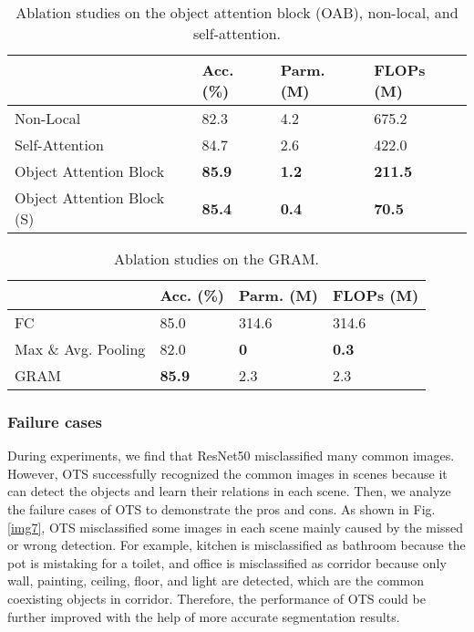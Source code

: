 \documentclass[letterpaper, 10 pt, conference]{ieeeconf}  %
\begin{document}
\begin{tiny}
\begin{table}[tp!]
\centering
\caption{Ablation studies on the object attention block (OAB), non-local, and self-attention.}\label{tab8}
\begin{tabular}{llll}
\hline
&Acc. (\%)&Parm. (M)&FLOPs (M)\\
\hline
Non-Local \cite{Wang2017}&82.3&4.2&675.2\\
Self-Attention \cite{Zhang2019}&84.7&2.6&422.0\\
Object Attention Block&\textbf{85.9}&\textbf{1.2}&\textbf{211.5}\\
Object Attention Block (S)&\textbf{85.4}&\textbf{0.4}&\textbf{70.5}\\
\hline
\end{tabular}
\vspace{-5mm}
\end{table}
\end{tiny}

\begin{tiny}
\begin{table}[tp!]
\centering
\caption{Ablation studies on the GRAM.}\label{tab9}
\begin{tabular}{llll}
\hline
&Acc. (\%)&Parm. (M)&FLOPs (M)\\
\hline
FC&85.0&314.6&314.6\\
Max \& Avg. Pooling&82.0&\textbf{0}&\textbf{0.3}\\
GRAM&\textbf{85.9}&2.3&2.3\\
\hline
\end{tabular}
\vspace{-5mm}
\end{table}
\end{tiny}

\vspace{1mm}
\subsubsection{Failure cases}
\label{Failure cases}
During experiments, we find that ResNet50 misclassified many common images. However, OTS successfully recognized the common images in scenes because it can detect the objects and learn their relations in each scene. Then, we analyze the failure cases of OTS to demonstrate the pros and cons. As shown in Fig. \ref{img7}, OTS misclassified some images in each scene mainly caused by the missed or wrong detection. For example, kitchen is misclassified as bathroom because the pot is mistaking for a toilet, and office is misclassified as corridor because only wall, painting, ceiling, floor, and light are detected, which are the common coexisting objects in corridor. Therefore, the performance of OTS could be further improved with the help of more accurate segmentation results.
\end{document}
